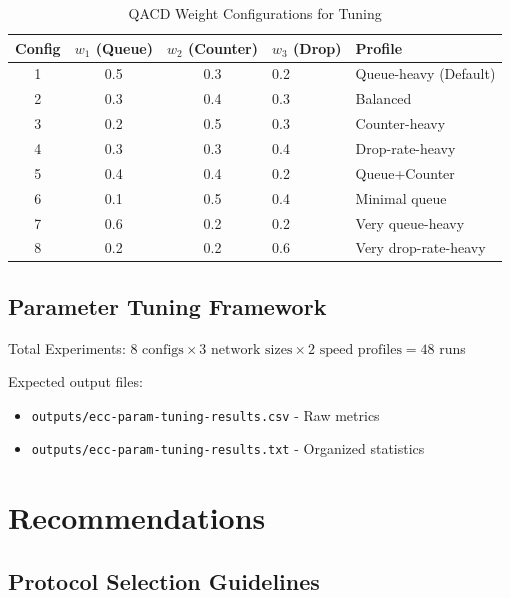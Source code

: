 \documentclass[11pt,a4paper]{article}
\begin{document}
\begin{table}[H]
\centering
\caption{QACD Weight Configurations for Tuning}
\begin{tabular}{cccl}
\toprule
\textbf{Config} & $w_1$ (Queue) & $w_2$ (Counter) & $w_3$ (Drop) & \textbf{Profile} \\
 & 0.5 & 0.3 & 0.2 & Queue-heavy (Default) \\
2 & 0.3 & 0.4 & 0.3 & Balanced \\
3 & 0.2 & 0.5 & 0.3 & Counter-heavy \\
4 & 0.3 & 0.3 & 0.4 & Drop-rate-heavy \\
5 & 0.4 & 0.4 & 0.2 & Queue+Counter \\
6 & 0.1 & 0.5 & 0.4 & Minimal queue \\
7 & 0.6 & 0.2 & 0.2 & Very queue-heavy \\
8 & 0.2 & 0.2 & 0.6 & Very drop-rate-heavy \\
\bottomrule
\end{tabular}
\end{table}

\subsection{Parameter Tuning Framework}

Total Experiments: $8 \text{ configs} \times 3 \text{ network sizes} \times 2 \text{ speed profiles} = 48$ runs

Expected output files:
\begin{itemize}
    \item \texttt{outputs/ecc-param-tuning-results.csv} - Raw metrics
    \item \texttt{outputs/ecc-param-tuning-results.txt} - Organized statistics
\end{itemize}

\section{Recommendations}

\subsection{Protocol Selection Guidelines}
\end{document}
